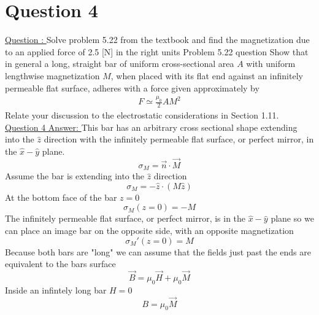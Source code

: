 \documentclass[12pt]{article}
\begin{document}
\section{Question 4} \label{section4}
    \underline{Question : }
    Solve problem 5.22 from the textbook and find the magnetization due to an applied force of 2.5 [N] in the right units
    \newline Problem 5.22 question
    \newline Show that in general a long, straight bar of uniform cross-sectional area $A$ with uniform lengthwise magnetization $M$, when placed with its flat end against an infinitely permeable flat surface, adheres with a force given approximately by 
    \begin{gather*}
        F \simeq \frac{\mu_0}{2} A M^2
    \end{gather*}
    Relate your discussion to the electrostatic considerations in Section 1.11.
    \underline{Question 4 Answer: }
    This bar has an arbitrary cross sectional shape extending into the $\hat{z}$ direction with the infinitely permeable flat surface, or perfect mirror, in the $\hat{x}-\hat{y}$ plane. 
    \begin{equation} \label{eq: 4-1}
        \sigma_M = \vec{n} \cdot \vec{M}
    \end{equation}
    Assume the bar is extending into the $\hat{z}$ direction
    \begin{equation} \label{eq: 4-2}
        \sigma_M = -\hat{z} \cdot (M \hat{z})
    \end{equation}
    At the bottom face of the bar $z=0$
    \begin{equation} \label{eq: 4-3}
        \sigma_M(z=0) = -M
    \end{equation}
    The infinitely permeable flat surface, or perfect mirror, is in the $\hat{x}-\hat{y}$ plane so we can place an image bar on the opposite side, with an opposite magnetization
    \begin{equation} \label{eq: 4-4}
        \sigma_M'(z=0) = M
    \end{equation}
    Because both bars are "long" we can assume that the fields just past the ends are equivalent to the bars surface
    \begin{equation} \label{eq: 4-5}
        \vec{B} = \mu_0 \vec{H} + \mu_0 \vec{M}
    \end{equation}
    Inside an infintely long bar $H=0$
    \begin{equation} \label{eq: 4-6}
        B = \mu_0 \vec{M}
    \end{equation}
\end{document}
